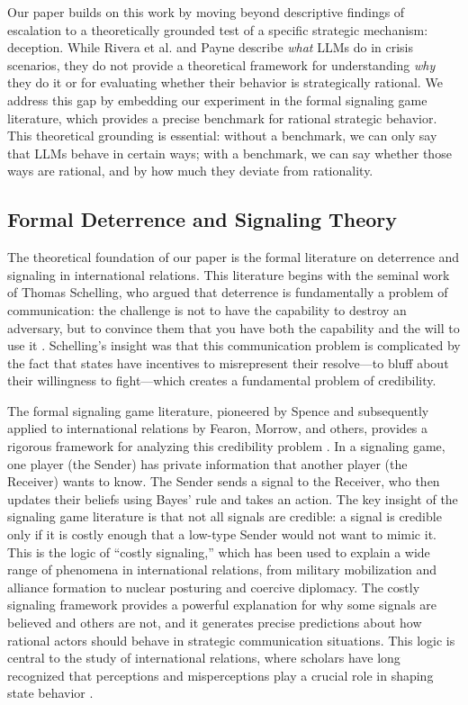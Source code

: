 \documentclass[12pt]{article}
\theoremstyle{plain}
\theoremstyle{definition}
\begin{document}
Our paper builds on this work by moving beyond descriptive findings of escalation to a theoretically grounded test of a specific strategic mechanism: deception. While Rivera et al. and Payne describe \textit{what} LLMs do in crisis scenarios, they do not provide a theoretical framework for understanding \textit{why} they do it or for evaluating whether their behavior is strategically rational. We address this gap by embedding our experiment in the formal signaling game literature, which provides a precise benchmark for rational strategic behavior. This theoretical grounding is essential: without a benchmark, we can only say that LLMs behave in certain ways; with a benchmark, we can say whether those ways are rational, and by how much they deviate from rationality.

\subsection{Formal Deterrence and Signaling Theory}

The theoretical foundation of our paper is the formal literature on deterrence and signaling in international relations. This literature begins with the seminal work of Thomas Schelling, who argued that deterrence is fundamentally a problem of communication: the challenge is not to have the capability to destroy an adversary, but to convince them that you have both the capability and the will to use it \citep{Schelling1960}. Schelling's insight was that this communication problem is complicated by the fact that states have incentives to misrepresent their resolve---to bluff about their willingness to fight---which creates a fundamental problem of credibility.

The formal signaling game literature, pioneered by Spence \citep{Spence1973} and subsequently applied to international relations by Fearon, Morrow, and others, provides a rigorous framework for analyzing this credibility problem \citep{Fearon1994, Morrow1989}. In a signaling game, one player (the Sender) has private information that another player (the Receiver) wants to know. The Sender sends a signal to the Receiver, who then updates their beliefs using Bayes' rule and takes an action. The key insight of the signaling game literature is that not all signals are credible: a signal is credible only if it is costly enough that a low-type Sender would not want to mimic it. This is the logic of ``costly signaling,'' which has been used to explain a wide range of phenomena in international relations, from military mobilization and alliance formation to nuclear posturing and coercive diplomacy. The costly signaling framework provides a powerful explanation for why some signals are believed and others are not, and it generates precise predictions about how rational actors should behave in strategic communication situations. This logic is central to the study of international relations, where scholars have long recognized that perceptions and misperceptions play a crucial role in shaping state behavior \citep{Jervis1976}.
\end{document}

